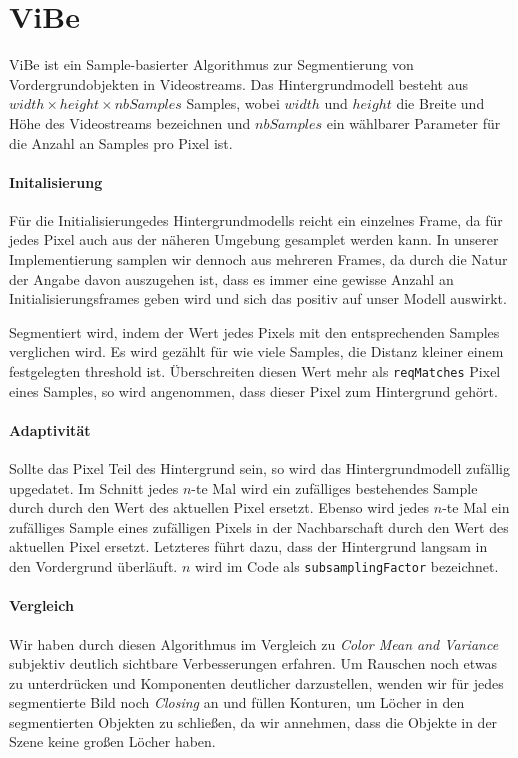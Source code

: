 \documentclass[]{scrartcl}
\begin{document}
\section{ViBe}\label{sec:vibe}
ViBe ist ein Sample-basierter Algorithmus zur Segmentierung von Vordergrundobjekten in Videostreams. Das Hintergrundmodell besteht aus $width \times height \times nbSamples$ Samples, wobei $width$ und $height$ die Breite und H\"ohe des Videostreams bezeichnen und $nbSamples$ ein w\"ahlbarer Parameter f\"ur die Anzahl an Samples pro Pixel ist. 

\paragraph{Initalisierung}
F\"ur die Initialisierungedes Hintergrundmodells reicht ein einzelnes Frame, da f\"ur jedes Pixel auch aus der n\"aheren Umgebung gesamplet werden kann. In unserer Implementierung samplen wir dennoch aus mehreren Frames, da durch die Natur der Angabe davon auszugehen ist, dass es immer eine gewisse Anzahl an Initialisierungsframes geben wird und sich das positiv auf unser Modell auswirkt.

Segmentiert wird, indem der Wert jedes Pixels mit den entsprechenden Samples verglichen wird. Es wird gez\"ahlt f\"ur wie viele Samples, die Distanz kleiner einem festgelegten threshold ist. \"Uberschreiten diesen Wert mehr als \texttt{reqMatches} Pixel eines Samples, so wird angenommen, dass dieser Pixel zum Hintergrund geh\"ort.

\paragraph{Adaptivit\"at}
Sollte das Pixel Teil des Hintergrund sein, so wird das Hintergrundmodell zuf\"allig upgedatet. Im Schnitt jedes $n$-te Mal wird ein zuf\"alliges bestehendes Sample durch durch den Wert des aktuellen Pixel ersetzt. Ebenso wird jedes $n$-te Mal ein zuf\"alliges Sample eines zuf\"alligen Pixels in der Nachbarschaft durch den Wert des aktuellen Pixel ersetzt. Letzteres f\"uhrt dazu, dass der Hintergrund langsam in den Vordergrund \"uberl\"auft. $n$ wird im Code als \texttt{subsamplingFactor} bezeichnet.

\paragraph{Vergleich}
Wir haben durch diesen Algorithmus im Vergleich zu \textit{Color Mean and Variance} subjektiv deutlich sichtbare Verbesserungen erfahren. Um Rauschen noch etwas zu unterdr\"ucken und Komponenten deutlicher darzustellen, wenden wir f\"ur jedes segmentierte Bild noch \textit{Closing} an und f\"ullen Konturen, um L\"ocher in den segmentierten Objekten zu schließen, da wir annehmen, dass die Objekte in der Szene keine gro\ss{}en L\"ocher haben.
\end{document}
